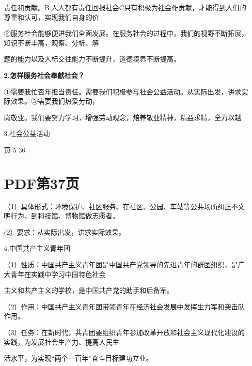 \documentclass[lang=cn,11pt]{elegantbook}
\newcommand{\daofasym}[1]{{\daofasymbolfont #1}}
\newcommand{\daofasym}[1]{#1}
\begin{document}
责任和贡献。B.人人都有责任回报社会C只有积极为社会作贡献，才能得到人们的尊重和认可，实现我们自身的价\par

\daofasym{②}服务社会能够便进我们全面发展。在服务社会的过程中，我们的视野不断拓展，知识不断丰高，观察、分析、解\par

题的能力以及人标交往能力不断提升，道德境界不断提高。\par

\textbf{2.怎样服务社会奉献社会？}\par

\daofasym{①}需要我忙否年担当责任。需要我们积极参与社会公益活动。从实际出发，讲求实际效果。\daofasym{③}需要我们热爱劳动，\par

岗敬业。我们要努力学习，增强劳动观念，焙养敬业精神，精益求精，全力以越\par

3.社会公益活动\par

页 5 36\par


\section*{PDF第37页}

（1）具体形式：环境保护、社区服务、在社区、公园、车站等公共场所纠正不文明行为、到科技馆、博物馆做志愿者。\par

(2）要求：从实际出发，讲求实际效果。\par

4.中国共产主义青年团\par

（1）性质：中国共产主义青年团是中国共产党领导的先进青年的群团组织，是广大青年在实践中学习中国特色社会\par

主义和共产主义的学校，是中国共产党的助手和后备军。\par

（2）作用：中国共产主义青年团带领青年在经济社会发展中发挥生力军和突击队作用。\par

（3）任务：在新时代，共青团要组织青年参加改革开放和社会主义现代化建设的实践，为发展社会生产力、提高人民生\par

活水平，为实现“两个一百年”奋斗目标建功立业。\par
\end{document}
